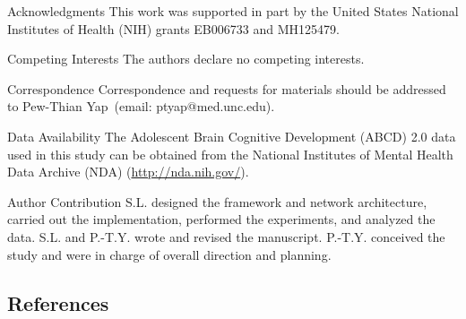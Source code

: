 \documentclass{nature}
\begin{document}
\begin{addendum}
	\item[Acknowledgments] This work was supported in part by the United States National Institutes of Health (NIH) grants EB006733 and MH125479. 
	\item[Competing Interests] The authors declare no competing interests.
	\item[Correspondence] Correspondence and requests for materials
	should be addressed to Pew-Thian Yap~(email: ptyap@med.unc.edu).
	\item[Data Availability] The Adolescent Brain Cognitive Development (ABCD) 2.0 data used in this study can be obtained from the National Institutes of Mental Health Data Archive (NDA) (\url{http://nda.nih.gov/}).
	\item[Author Contribution] S.L. designed the framework and network architecture, carried out the implementation, performed the experiments, and analyzed the data. S.L. and P.-T.Y. wrote and revised the manuscript.
	P.-T.Y. conceived the study and were in charge of overall direction and planning. 
\end{addendum}

\subsection{References}
\footnotesize
%
%
\end{document}
